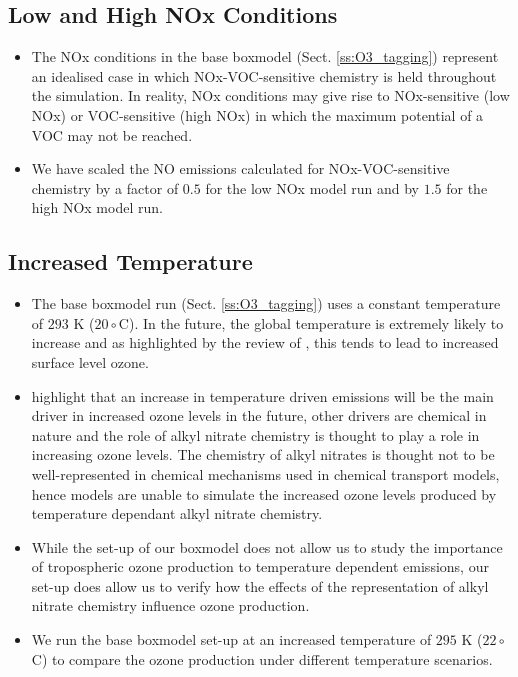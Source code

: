 \subsection{Low and High NOx Conditions} \label{ss:NOx_conditions}
\begin{itemize}
    \item The NOx conditions in the base boxmodel (Sect. \ref{ss:O3_tagging}) represent an idealised case in which NOx-VOC-sensitive chemistry is held throughout the simulation. In reality, NOx conditions may give rise to NOx-sensitive (low NOx) or VOC-sensitive (high NOx)  in which the maximum potential of a VOC may not be reached. 
    \item We have scaled the NO emissions calculated for NOx-VOC-sensitive chemistry by a factor of $0.5$ for the low NOx model run and by $1.5$ for the high NOx model run.
\end{itemize}

\subsection{Increased Temperature} \label{ss:temperature}
\begin{itemize}
    \item The base boxmodel run (Sect. \ref{ss:O3_tagging}) uses a constant temperature of $293$ K ($20 \circ$C). In the future, the global temperature is extremely likely to increase and as highlighted by the review of \citet{Pusede:2015}, this tends to lead to increased surface level ozone.
    \item \citet{Pusede:2015} highlight that an increase in temperature driven emissions will be the main driver in increased ozone levels in the future, other drivers are chemical in nature and the role of alkyl nitrate chemistry is thought to play a role in increasing ozone levels. The chemistry of alkyl nitrates is thought not to be well-represented in chemical mechanisms used in chemical transport models, hence models are unable to simulate the increased ozone levels produced by temperature dependant alkyl nitrate chemistry.
    \item While the set-up of our boxmodel does not allow us to study the importance of tropospheric ozone production to temperature dependent emissions, our set-up does allow us to verify how the effects of the representation of alkyl nitrate chemistry influence ozone production.
    \item We run the base boxmodel set-up at an increased temperature of $295$ K ($22 \circ$C) to compare the ozone production under different temperature scenarios.
\end{itemize}
